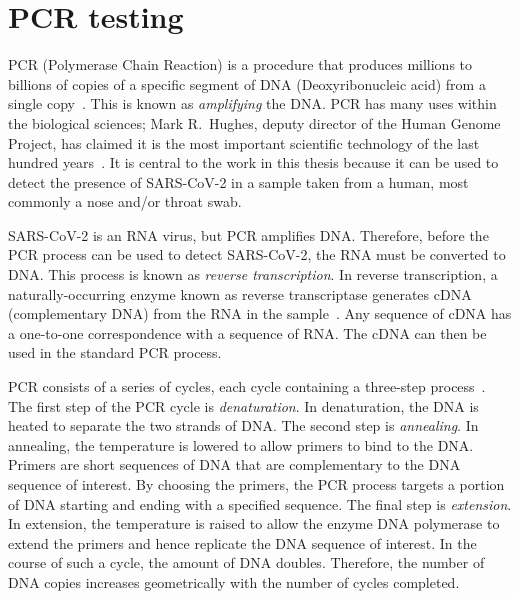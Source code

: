 \documentclass[thesis.tex]{subfiles}
\begin{document}

\section{PCR testing} \label{biology-data:sec:PCR}


PCR (Polymerase Chain Reaction) is a procedure that produces millions to billions of copies of a specific segment of DNA (Deoxyribonucleic acid) from a single copy~\autocite{smithPCR,garibyanPCR}.
This is known as \emph{amplifying} the DNA.
PCR has many uses within the biological sciences; Mark R.\ Hughes, deputy director of the Human Genome Project, has claimed it is the most important scientific technology of the last hundred years~\autocite{powledgePCR}.
It is central to the work in this thesis because it can be used to detect the presence of SARS-CoV-2 in a sample taken from a human, most commonly a nose and/or throat swab.

SARS-CoV-2 is an RNA virus, but PCR amplifies DNA.
Therefore, before the PCR process can be used to detect SARS-CoV-2, the RNA must be converted to DNA.
This process is known as \emph{reverse transcription}.
In reverse transcription, a naturally-occurring enzyme known as reverse transcriptase generates cDNA (complementary DNA) from the RNA in the sample~\autocites{valasekPower}.
Any sequence of cDNA has a one-to-one correspondence with a sequence of RNA.
The cDNA can then be used in the standard PCR process.

PCR consists of a series of cycles, each cycle containing a three-step process~\autocite{powledgePCR,garibyanPCR}.
The first step of the PCR cycle is \emph{denaturation}.
In denaturation, the DNA is heated to separate the two strands of DNA.
The second step is \emph{annealing}.
In annealing, the temperature is lowered to allow primers to bind to the DNA.
Primers are short sequences of DNA that are complementary to the DNA sequence of interest.
By choosing the primers, the PCR process targets a portion of DNA starting and ending with a specified sequence.
The final step is \emph{extension}.
In extension, the temperature is raised to allow the enzyme DNA polymerase to extend the primers and hence replicate the DNA sequence of interest.
In the course of such a cycle, the amount of DNA doubles.
Therefore, the number of DNA copies increases geometrically with the number of cycles completed.
\end{document}
